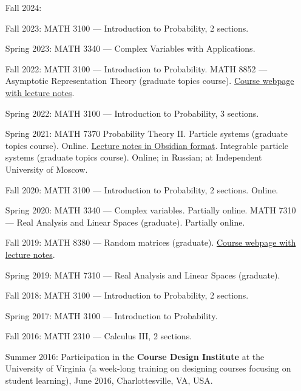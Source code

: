 \documentclass[letterpaper,11pt]{article}
\begin{document}
\begin{itemize}
\item[Fall 2024:]


\item[Fall 2023:]
	MATH 3100 --- Introduction to Probability, 2 sections.

\item[Spring 2023:]
	MATH 3340 --- Complex Variables with Applications.

\item[Fall 2022:]
	MATH 3100 --- Introduction to Probability.
	MATH 8852 --- Asymptotic Representation Theory (graduate topics course). \href{https://lpetrov.cc/art2022/}{Course webpage with lecture notes}.

\item[Spring 2022:]
	MATH 3100 --- Introduction to Probability, 3 sections.

\item[Spring 2021:]
	MATH 7370 Probability Theory II. Particle systems (graduate topics course). Online. \href{https://github.com/lenis2000/HTML_ParticleSysS21}{Lecture notes in Obsidian format}.
	Integrable particle systems (graduate topics course). Online; in Russian; at Independent University of Moscow.

\item[Fall 2020:]
	MATH 3100 --- Introduction to Probability, 2 sections. Online.

\item[Spring 2020:]
	MATH 3340 --- Complex variables. Partially online.
	MATH 7310 --- Real Analysis and Linear Spaces (graduate). Partially online.

\item[Fall 2019:]
	MATH 8380 --- Random matrices (graduate). \href{https://lpetrov.cc/rmt19/}{Course webpage with lecture notes}.

\item[Spring 2019:]
	MATH 7310 --- Real Analysis and Linear Spaces (graduate).

\item[Fall 2018:]
	MATH 3100 --- Introduction to Probability, 2 sections.

\item[Spring 2017:]
	MATH 3100 --- Introduction to Probability.

\item[Fall 2016:]
	MATH 2310 --- Calculus III, 2 sections.

\item[Summer 2016:] Participation in the \textbf{Course Design Institute} at the University of Virginia (a week-long training on designing courses focusing on student learning), June 2016, Charlottesville, VA, USA.


\end{itemize}
\end{document}
